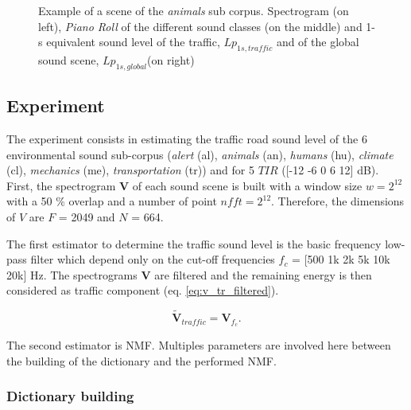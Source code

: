\documentclass[twocolumn,a4paper,10pt]{article}
\begin{document}
\begin{figure}
\begin{minipage}[c]{.32\linewidth}
   \end{minipage}
\caption{Example of a scene of the \textit{animals} sub corpus. Spectrogram (on left), \textit{Piano Roll} of the different sound classes (on the middle) and 1-s equivalent sound level of the traffic, $Lp_{1s,traffic}$ and of the global sound scene, $Lp_{1s,global}$(on right)}
\label{fig:exampleScene}
\end{figure}

\subsection{Experiment}

The experiment consists in estimating the traffic road sound level of the 6 environmental sound sub-corpus (\textit{alert} (al), \textit{animals} (an), \textit{humans} (hu), \textit{climate} (cl), \textit{mechanics} (me), \textit{transportation} (tr)) and for 5 $TIR$ ([-12 -6 0 6 12] dB). First, the spectrogram $\mathbf{V}$ of each sound scene is built with a window size $w = 2^{12}$ with a 50 $\%$ overlap and a number of point $nfft = 2^{12}$. Therefore, the dimensions of $V$ are $F$ = 2049 and $N$ = 664. 

The first estimator to determine the traffic sound level is the basic frequency low-pass filter which depend only on the cut-off frequencies $f_c$ = [500 1k 2k 5k 10k 20k] Hz. The spectrograms $\mathbf{V}$ are filtered and the remaining energy is then considered as traffic component (eq. \ref{eq:v_tr_filtered}). 

\begin{equation}\label{eq:v_tr_filtered}
\mathbf{\tilde{V}}_{traffic} = \mathbf{V}_{f_c}.
\end{equation}

The second estimator is NMF. Multiples parameters are involved here between the building of the dictionary and the performed NMF. 

\subsubsection{Dictionary building}
\end{document}
